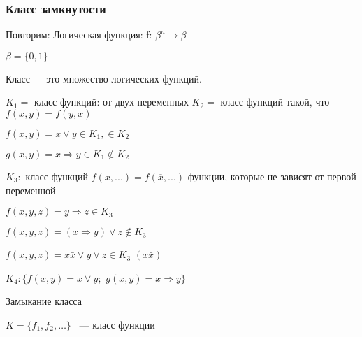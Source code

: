 \documentclass[russian]{lecture-notes}
\begin{document}
    \subsubsection{Класс замкнутости}

    Повторим: Логическая функция: f: $\beta^{n} \rightarrow \beta$

    $\beta = \{0,1\}$

    \begin{definition}
        Класс ~-- это множество логических функций.
    \end{definition}

    \begin{example}

        $K_{1} = $ класс функций: от двух переменных
        $K_{2} = $ класс функций такой, что $f(x,y) = f(y,x)$

        $f(x,y) = x \lor y \in K_{1}, \in K_{2}$

        $g(x,y) = x \Rightarrow y \in K_{1} \notin K_{2}$

        $K_{3}:$ класс функций $f(x,...) = f(\overline{x}, ...)$
        функции, которые не зависят от первой переменной

        $f(x,y,z) = y \Rightarrow z \in K_{3}$

        $f(x,y,z) = (x \Rightarrow y) \lor z \notin K_{3}$

        $f(x,y,z) = x\bar{x} \lor y \lor z \in K_{3}$ \quad $(x \bar{x})$

        $K_{4}: \{f(x,y) = x \lor y;$  $ g(x,y) = x \Rightarrow y\}$

    \end{example}

    \begin{definition}
        Замыкание класса

        $K = \{f_{1},f_{2},\dots\}$ ~--- класс функции

    \end{definition}
\end{document}
